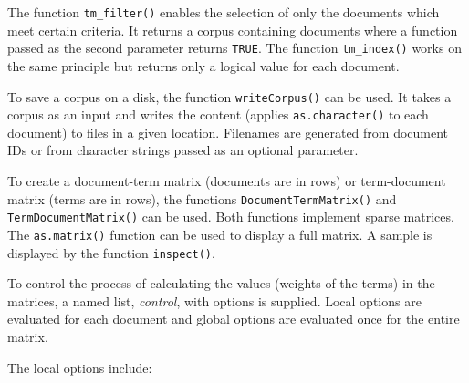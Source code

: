 The function \texttt{tm\_filter()} enables the selection of only the documents
which meet certain criteria. It returns a corpus containing documents where a
function passed as the second parameter returns \texttt{TRUE}. The function \texttt{tm\_index()}
works on the same principle but returns only a logical value for each document.

To save a corpus on a disk, the function \texttt{writeCorpus()} can be used. It takes
a corpus as an input and writes the content (applies \texttt{as.character()} to each
document) to files in a given location. Filenames are generated from document
IDs or from character strings passed as an optional parameter.

To create a document-term matrix (documents are in rows) or term-document matrix (terms are in rows), the functions \texttt{DocumentTermMatrix()}
and \texttt{TermDocumentMatrix()} can be used. Both functions implement sparse
matrices. The \texttt{as.matrix()} function can be used to display a full matrix. A
sample is displayed by the function \texttt{inspect()}.

To control the process of calculating the values (weights of the terms) in
the matrices, a named list, \textit{control}, with options is supplied. Local options are
evaluated for each document and global options are evaluated once for the entire
matrix.

The local options include:

